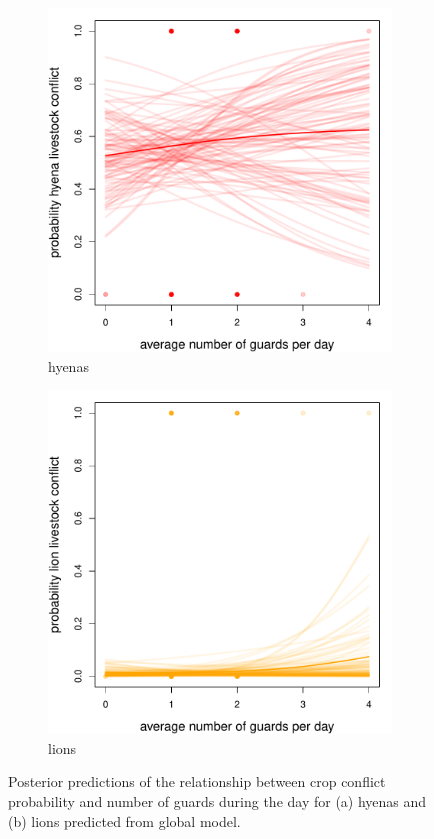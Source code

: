 \documentclass[12pt,]{article}
\begin{document}
\begin{figure}[H]
  \centering
	\begin{subfigure}[b]{0.49\textwidth}
	\includegraphics[width=\textwidth]{Figures/num_guards_livestock_global_conflict_hyena.pdf} 
    \caption{hyenas}
   	    \label{fig:cropGUhyena}
\end{subfigure}
\begin{subfigure}[b]{0.49\textwidth}
	\includegraphics[width=\textwidth]{Figures/num_guards_livestock_global_conflict_lion.pdf}  
    \caption{lions}
  	\label{fig:cropGUleo}
\end{subfigure}
\caption{Posterior predictions of the relationship between crop conflict probability and number of guards during the day for (a) hyenas and (b) lions predicted from global model.}
\end{figure}
\end{document}
